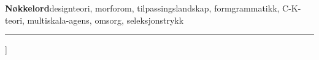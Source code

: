 {\begin{@twocolumnfalse}
{\begin{minipage}{0.94\textwidth}
{\vspace{4pt}
\noindent\textbf{Nøkkelord}\quad designteori, morforom, tilpassingslandskap, formgrammatikk, C-K-teori, multiskala-agens, omsorg, seleksjonstrykk
}

\vspace{4pt}
\noindent\rule{\textwidth}{0.4pt}
\end{minipage}
\par}

\vspace{8pt}

\end{@twocolumnfalse}
}]










\begingroup
\small
\printbibliography[title={Referansar}]
\endgroup


